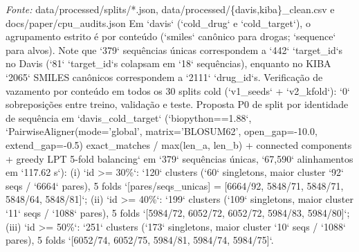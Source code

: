 \begin{table}[htbp]
\begin{tabular}{lllllllllllllllllll}
\bottomrule
\end{tabular}
\begin{flushleft}
\footnotesize \textit{Fonte:} data/processed/splits/*.json, data/processed/\{davis,kiba\}\_clean.csv e docs/paper/cpu\_audits.json Em `davis` (`cold\_drug` e `cold\_target`), o agrupamento estrito é por conteúdo (`smiles` canônico para drogas; `sequence` para alvos). Note que `379` sequências únicas correspondem a `442` `target\_id`s no Davis (`81` `target\_id`s colapsam em `18` sequências), enquanto no KIBA `2065` SMILES canônicos correspondem a `2111` `drug\_id`s. Verificação de vazamento por conteúdo em todos os 30 splits cold (`v1\_seeds` + `v2\_kfold`): `0` sobreposições entre treino, validação e teste. Proposta P0 de split por identidade de sequência em `davis\_cold\_target` (`biopython==1.88`, `PairwiseAligner(mode='global', matrix='BLOSUM62', open\_gap=-10.0, extend\_gap=-0.5) exact\_matches / max(len\_a, len\_b) + connected components + greedy LPT 5-fold balancing` em `379` sequências únicas, `67,590` alinhamentos em `117.62 s`): (i) `id >= 30\%`: `120` clusters (`60` singletons, maior cluster `92` seqs / `6664` pares), 5 folds `[pares/seqs\_unicas] = [6664/92, 5848/71, 5848/71, 5848/64, 5848/81]`; (ii) `id >= 40\%`: `199` clusters (`109` singletons, maior cluster `11` seqs / `1088` pares), 5 folds `[5984/72, 6052/72, 6052/72, 5984/83, 5984/80]`; (iii) `id >= 50\%`: `251` clusters (`173` singletons, maior cluster `10` seqs / `1088` pares), 5 folds `[6052/74, 6052/75, 5984/81, 5984/74, 5984/75]`.
\end{flushleft}
\end{table}
